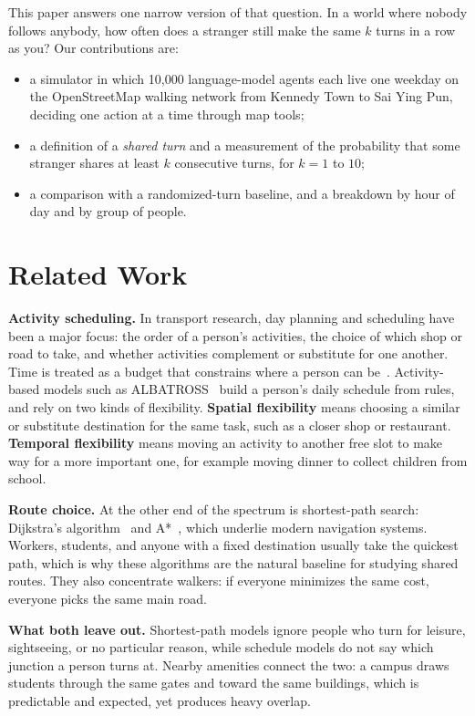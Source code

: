 \documentclass[9pt]{ieeeconf}
\begin{document}
This paper answers one narrow version of that question. In a world where nobody follows anybody, how often does a stranger still make the same $k$ turns in a row as you? Our contributions are:
\begin{itemize}
    \item a simulator in which 10,000 language-model agents each live one weekday on the OpenStreetMap walking network from Kennedy Town to Sai Ying Pun, deciding one action at a time through map tools;
    \item a definition of a \emph{shared turn} and a measurement of the probability that some stranger shares at least $k$ consecutive turns, for $k=1$ to $10$;
    \item a comparison with a randomized-turn baseline, and a breakdown by hour of day and by group of people.
\end{itemize}

\section{Related Work}
\label{sec:related}
\textbf{Activity scheduling.} In transport research, day planning and scheduling have been a major focus: the order of a person's activities, the choice of which shop or road to take, and whether activities complement or substitute for one another. Time is treated as a budget that constrains where a person can be~\cite{hagerstrand1970}. Activity-based models such as ALBATROSS~\cite{arentze2004albatross} %
build a person's daily schedule from rules, and rely on two kinds of flexibility. \textbf{Spatial flexibility} means choosing a similar or substitute destination for the same task, such as a closer shop or restaurant. \textbf{Temporal flexibility} means moving an activity to another free slot to make way for a more important one, for example moving dinner to collect children from school.

\textbf{Route choice.} At the other end of the spectrum is shortest-path search: Dijkstra's algorithm~\cite{dijkstra1959} and A*~\cite{hart1968astar}, which underlie modern navigation systems. Workers, students, and anyone with a fixed destination usually take the quickest path, which is why these algorithms are the natural baseline for studying shared routes. They also concentrate walkers: if everyone minimizes the same cost, everyone picks the same main road.

\textbf{What both leave out.} Shortest-path models ignore people who turn for leisure, sightseeing, or no particular reason, while schedule models do not say which junction a person turns at. Nearby amenities connect the two: a campus draws students through the same gates and toward the same buildings, which is predictable and expected, yet produces heavy overlap.
\end{document}

